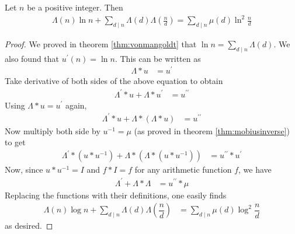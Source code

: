 \documentclass{subfile}
\begin{document}
	\begin{theorem}
		Let $n$ be a positive integer. Then
			\begin{align*}
				\Lambda(n)\ln n+\sum_{d\mid n}\Lambda(d)\Lambda\left(\frac nd\right)=\sum_{d\mid n}\mu(d)\ln^2\frac nd
			\end{align*}
	\end{theorem}
	\begin{proof}
		We proved in theorem \eqref{thm:vonmangoldt} that $\ln n=\sum_{d\mid n}\Lambda(d)$. We also found that $u^\prime(n) = \ln n$. This can be written as
			\begin{align*}
				\Lambda\ast u & =u^\prime
			\end{align*}
		Take derivative of both sides of the above equation to obtain
			\begin{align*}
				\Lambda^\prime\ast u+\Lambda\ast u^\prime & =u^{\prime\prime}
			\end{align*}
		Using $\Lambda\ast u  =u^\prime$ again,
			\begin{align*}
				\Lambda^\prime\ast u+\Lambda\ast(\Lambda\ast u) & =u^{\prime\prime}
			\end{align*}
		Now multiply both side by $u^{-1}=\mu$ (as proved in theorem \eqref{thm:mobiusinverse}) to get
			\begin{align*}
				\Lambda^\prime\ast(u\ast u^{-1})+\Lambda\ast(\Lambda\ast(u\ast u^{-1}))
					& =u^{\prime\prime}\ast u^\prime
			\end{align*}
		Now, since $u \ast u^{-1} = I$ and $f \ast I = f$ for any arithmetic function $f$, we have
			\begin{align*}
				\Lambda^\prime+\Lambda\ast\Lambda & =u^{\prime\prime}\ast\mu
			\end{align*}
		Replacing the functions with their definitions, one easily finds
			\begin{align*}
				\Lambda(n)\log n+\sum_{d\mid n}\Lambda(d)\Lambda\left(\dfrac nd\right) & =\sum_{d\mid n}\mu(d)\log^2\dfrac nd
			\end{align*}
		as desired.
	\end{proof}
\end{document}
